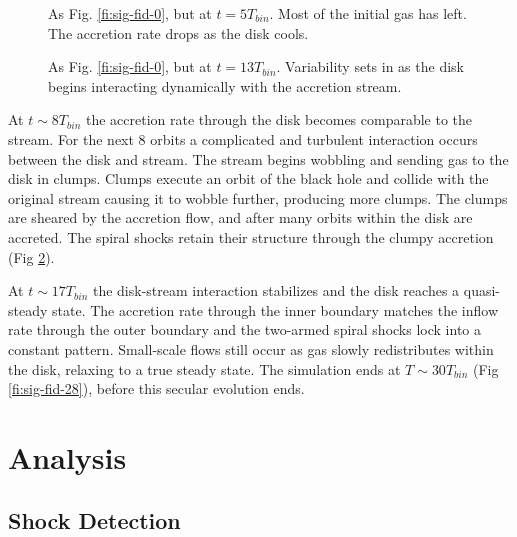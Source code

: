 \documentclass{emulateapj}
\begin{document}
\begin{figure}
\caption{\label{fi:sig-fid-5} As Fig. \ref{fi:sig-fid-0}, but at $t = 5 T_{bin}$.  Most of the initial gas has left. The accretion rate drops as the disk cools.}
\end{figure}

\begin{figure}
\caption{\label{fi:sig-fid-13} As Fig. \ref{fi:sig-fid-0}, but at $t = 13 T_{bin}$.  Variability sets in as the disk begins interacting dynamically with the accretion stream.}
\end{figure}


At $t\sim 8 T_{bin}$ the accretion rate through the disk becomes comparable to the stream.  For the next 8 orbits a complicated and turbulent interaction occurs between the disk and stream.  The stream begins wobbling and sending gas to the disk in clumps.  Clumps execute an orbit of the black hole and collide with the original stream causing it to wobble further, producing more clumps.  The clumps are sheared by the accretion flow, and after many orbits within the disk are accreted. The spiral shocks retain their structure through the clumpy accretion (Fig \ref{fi:sig-fid-13}).

At $t\sim17 T_{bin}$ the disk-stream interaction stabilizes and the disk reaches a quasi-steady state.  The accretion rate through the inner boundary matches the inflow rate through the outer boundary and the two-armed spiral shocks lock into a constant pattern.  Small-scale flows still occur as gas slowly redistributes within the disk, relaxing to a true steady state.  The simulation ends at $T\sim30 T_{bin}$ (Fig \ref{fi:sig-fid-28}), before this secular evolution ends.

\begin{figure*}
\caption{\label{fi:sig-fid-28} As Fig. \ref{fi:sig-fid-0}, but at $t = 28 T_{bin}$.  The disk in a quasi-steady state.}
\end{figure*}



\section{Analysis}
\label{sec:analysis}


\subsection{Shock Detection}
\label{subsec:shockDet}
\end{document}
